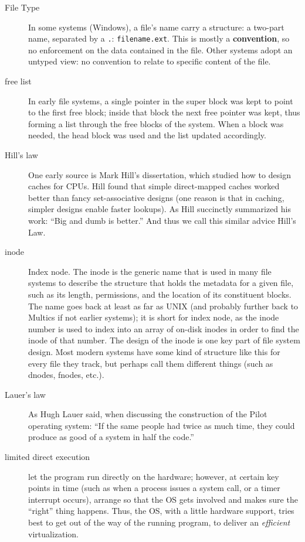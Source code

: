 \begin{description}
\item[File Type]  In some systems (Windows), a file's name carry a structure: a two-part name, separated by a \texttt{.}: \texttt{filename.ext}. This is mostly a \textbf{convention}, so no enforcement on the data contained in the file. Other systems adopt an untyped view: no convention to relate to specific content of the file.

\item[free list] In early file systems, a single pointer in the super block was kept to point to the first free block; inside that block the next free pointer was kept, thus forming a list through the free blocks of the system. When a block was needed, the head block was used and the list updated accordingly.

\item[Hill's law] One early source is Mark Hill's dissertation, which studied how to design caches for CPUs. Hill found that simple direct-mapped caches worked better than fancy set-associative designs (one reason is that in caching, simpler designs enable faster lookups). As Hill succinctly summarized
  his work: ``Big and dumb is better.'' And thus we call this similar advice Hill's Law.

\item[inode] Index node. The inode is the generic name that is used in many file systems to describe the structure that holds the metadata for a given file, such as its length, permissions, and the location of its constituent blocks. The name
goes back at least as far as UNIX (and probably further back to Multics if not earlier systems); it is short for index node, as the inode number is used to index into an array of on-disk inodes in order to find the inode of that number. The design of the inode is one key part of file system design. Most modern systems have some kind of structure like this for every file they track, but perhaps call them different things (such as dnodes, fnodes, etc.).

\item[Lauer's law] As Hugh Lauer said, when discussing the construction of the Pilot operating system: ``If the same people had twice as much time, they could produce as good of a system in half the code.''

\item[limited direct execution] let the program run directly on the hardware; however, at certain key points in time (such as when a process issues a system call, or a timer interrupt occurs), arrange so that the OS gets involved and makes sure the ``right'' thing happens.   Thus, the OS, with a little hardware support, tries best to get out of the way of the running program, to deliver an \emph{efficient} virtualization.


\end{description}
